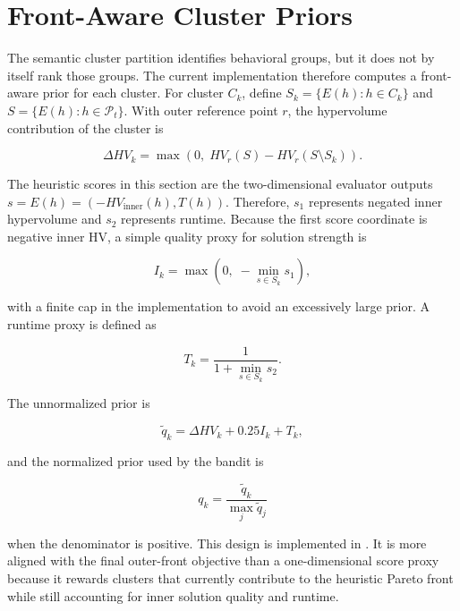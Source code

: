 \section{Front-Aware Cluster Priors}
\label{sec:front-aware-priors}

The semantic cluster partition identifies behavioral groups, but it does not by itself rank those groups. The current implementation therefore computes a front-aware prior for each cluster. For cluster $C_k$, define $S_k=\{E(h):h \in C_k\}$ and $S=\{E(h):h \in \mathcal{P}_t\}$. With outer reference point $r$, the hypervolume contribution of the cluster is

\begin{equation}
  \Delta HV_k
  =
  \max\left(0,\;HV_r(S)-HV_r(S\setminus S_k)\right).
\end{equation}

The heuristic scores in this section are the two-dimensional evaluator outputs $s=E(h)=(-HV_{\text{inner}}(h),T(h))$. Therefore, $s_1$ represents negated inner hypervolume and $s_2$ represents runtime. Because the first score coordinate is negative inner HV, a simple quality proxy for solution strength is

\begin{equation}
  I_k = \max\left(0,\;-\min_{s \in S_k} s_1\right),
\end{equation}

with a finite cap in the implementation to avoid an excessively large prior. A runtime proxy is defined as

\begin{equation}
  T_k = \frac{1}{1+\min_{s \in S_k} s_2}.
\end{equation}

The unnormalized prior is

\begin{equation}
  \tilde{q}_k = \Delta HV_k + 0.25 I_k + T_k,
\end{equation}

and the normalized prior used by the bandit is

\begin{equation}
  q_k = \frac{\tilde{q}_k}{\max_j \tilde{q}_j}
\end{equation}

when the denominator is positive. This design is implemented in . It is more aligned with the final outer-front objective than a one-dimensional score proxy because it rewards clusters that currently contribute to the heuristic Pareto front while still accounting for inner solution quality and runtime.

